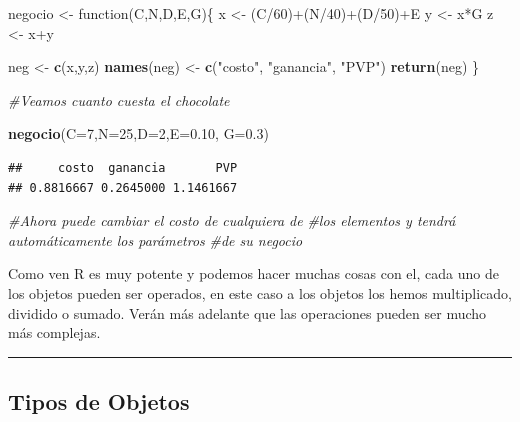 \documentclass[]{article}
\newenvironment{Shaded}{\begin{snugshade}}{\end{snugshade}}
\newcommand{\KeywordTok}[1]{\textcolor[rgb]{0.13,0.29,0.53}{\textbf{{#1}}}}
\newcommand{\DataTypeTok}[1]{\textcolor[rgb]{0.13,0.29,0.53}{{#1}}}
\newcommand{\DecValTok}[1]{\textcolor[rgb]{0.00,0.00,0.81}{{#1}}}
\newcommand{\FloatTok}[1]{\textcolor[rgb]{0.00,0.00,0.81}{{#1}}}
\newcommand{\StringTok}[1]{\textcolor[rgb]{0.31,0.60,0.02}{{#1}}}
\newcommand{\CommentTok}[1]{\textcolor[rgb]{0.56,0.35,0.01}{\textit{{#1}}}}
\newcommand{\NormalTok}[1]{{#1}}
\begin{document}
\begin{Shaded}
\begin{Highlighting}[]
\NormalTok{negocio <-}\StringTok{ }\NormalTok{function(C,N,D,E,G)\{}
  \NormalTok{x <-}\StringTok{ }\NormalTok{(C/}\DecValTok{60}\NormalTok{)+(N/}\DecValTok{40}\NormalTok{)+(D/}\DecValTok{50}\NormalTok{)+E}
  \NormalTok{y <-}\StringTok{ }\NormalTok{x*G}
  \NormalTok{z <-}\StringTok{ }\NormalTok{x+y}
  
  \NormalTok{neg <-}\StringTok{ }\KeywordTok{c}\NormalTok{(x,y,z)}
  \KeywordTok{names}\NormalTok{(neg) <-}\StringTok{ }\KeywordTok{c}\NormalTok{(}\StringTok{"costo"}\NormalTok{, }\StringTok{"ganancia"}\NormalTok{, }\StringTok{"PVP"}\NormalTok{)}
  \KeywordTok{return}\NormalTok{(neg)}
\NormalTok{\}}

\CommentTok{#Veamos cuanto cuesta el chocolate}

\KeywordTok{negocio}\NormalTok{(}\DataTypeTok{C=}\DecValTok{7}\NormalTok{,}\DataTypeTok{N=}\DecValTok{25}\NormalTok{,}\DataTypeTok{D=}\DecValTok{2}\NormalTok{,}\DataTypeTok{E=}\FloatTok{0.10}\NormalTok{, }\DataTypeTok{G=}\FloatTok{0.3}\NormalTok{)}
\end{Highlighting}
\end{Shaded}

\begin{verbatim}
##     costo  ganancia       PVP 
## 0.8816667 0.2645000 1.1461667
\end{verbatim}

\begin{Shaded}
\begin{Highlighting}[]
\CommentTok{#Ahora puede cambiar el costo de cualquiera de }
\CommentTok{#los elementos y tendrá automáticamente los parámetros}
\CommentTok{#de su negocio}
\end{Highlighting}
\end{Shaded}

Como ven R es muy potente y podemos hacer muchas cosas con el, cada uno
de los objetos pueden ser operados, en este caso a los objetos los hemos
multiplicado, dividido o sumado. Verán más adelante que las operaciones
pueden ser mucho más complejas.

\begin{center}\rule{0.5\linewidth}{\linethickness}\end{center}

\subsection{Tipos de Objetos}\label{tipos-de-objetos}
\end{document}

